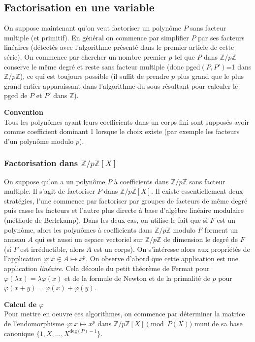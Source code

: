 \documentclass[a4paper,11pt]{article}
\begin{document}
\begin{giacjshere}
\subsection{Factorisation en une variable}
On suppose maintenant qu'on veut factoriser un polynôme $P$ sans facteur
multiple (et primitif). En général on commence par simplifier $P$ par
ses facteurs linéaires (détectés avec l'algorithme présenté dans le
premier article de cette série). On commence par chercher un nombre premier $p$
tel que $P$ dans $\mathbb{Z}/p\mathbb{Z}$ conserve le même degré et reste sans facteur 
multiple (donc pgcd$(P,P')$=1 dans $\mathbb{Z}/p\mathbb{Z}$), ce qui est toujours
possible (il suffit de prendre $p$ plus grand que le plus grand entier 
apparaissant dans l'algorithme du sous-résultant pour calculer
le pgcd de $P$ et $P'$ dans $\mathbb{Z}$).

{\bf Convention}\\
Tous les polynômes ayant leurs coefficients dans un corps fini sont
supposés avoir comme coefficient dominant 1 lorsque le choix
existe (par exemple les facteurs d'un polynôme modulo $p$).

\subsubsection{Factorisation dans $\mathbb{Z}/p\mathbb{Z}[X]$}
On suppose qu'on a un polynôme $P$ à coefficients dans $\mathbb{Z}/p\mathbb{Z}$ sans
facteur multiple. Il s'agit de factoriser $P$ dans $\mathbb{Z}/p\mathbb{Z}[X]$.
Il existe essentiellement deux stratégies, l'une commence par factoriser par
groupes de facteurs de même degré puis casse les facteurs et l'autre 
plus directe à base d'algèbre linéaire modulaire (méthode de Berlekamp). 
Dans les deux cas, on utilise le fait que si $F$ est un polynôme, 
alors les polynômes à coefficients dans $\mathbb{Z}/p\mathbb{Z}$
modulo $F$ forment un anneau $A$ qui est aussi un espace vectoriel 
sur $\mathbb{Z}/p\mathbb{Z}$ de dimension le degré de $F$ 
(si $F$ est irréductible, alors $A$ est un corps).
On s'intéresse alors aux propriétés de l'application 
$\varphi: x \in A \mapsto x^p$.
On observe d'abord que cette application est une application {\em linéaire\/}.
Cela découle du petit théorème de Fermat pour $\varphi(\lambda x)=\lambda
\varphi(x)$ et de la formule de Newton et de la primalité de $p$ pour
$\varphi(x+y)=\varphi(x)+\varphi(y)$.

{\bf Calcul de $\varphi$}\\
Pour mettre en oeuvre ces algorithmes, on commence par déterminer la matrice
de l'endomorphisme $\varphi: x \mapsto x^p$ dans $\mathbb{Z}/p\mathbb{Z}[X] \pmod {P(X)}$
muni de sa base canonique $\{ 1, X,...,X^{\mbox{deg}(P)-1} \}$.


\end{giacjshere}
\end{document}
